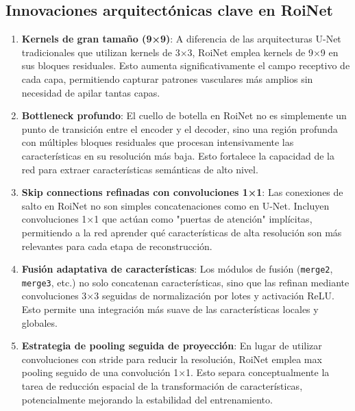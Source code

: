 \documentclass[11pt,a4paper]{report} %
\begin{document}
\subsection{Innovaciones arquitectónicas clave en RoiNet}
\begin{enumerate}
  \item \textbf{Kernels de gran tamaño (9×9)}: A diferencia de las arquitecturas U-Net tradicionales que utilizan kernels de 3×3, RoiNet emplea kernels de 9×9 en sus bloques residuales. Esto aumenta significativamente el campo receptivo de cada capa, permitiendo capturar patrones vasculares más amplios sin necesidad de apilar tantas capas.
  \item \textbf{Bottleneck profundo}: El cuello de botella en RoiNet no es simplemente un punto de transición entre el encoder y el decoder, sino una región profunda con múltiples bloques residuales que procesan intensivamente las características en su resolución más baja. Esto fortalece la capacidad de la red para extraer características semánticas de alto nivel.
  \item \textbf{Skip connections refinadas con convoluciones 1×1}: Las conexiones de salto en RoiNet no son simples concatenaciones como en U-Net. Incluyen convoluciones 1×1 que actúan como "puertas de atención" implícitas, permitiendo a la red aprender qué características de alta resolución son más relevantes para cada etapa de reconstrucción.
  \item \textbf{Fusión adaptativa de características}: Los módulos de fusión (\texttt{merge2}, \texttt{merge3}, etc.) no solo concatenan características, sino que las refinan mediante convoluciones 3×3 seguidas de normalización por lotes y activación ReLU. Esto permite una integración más suave de las características locales y globales.
  \item \textbf{Estrategia de pooling seguida de proyección}: En lugar de utilizar convoluciones con stride para reducir la resolución, RoiNet emplea max pooling seguido de una convolución 1×1. Esto separa conceptualmente la tarea de reducción espacial de la transformación de características, potencialmente mejorando la estabilidad del entrenamiento.
\end{enumerate}
\end{document}

